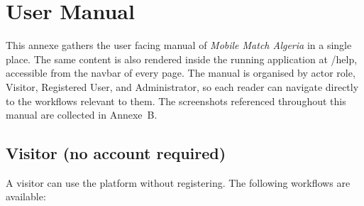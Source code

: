 
\appendix
\renewcommand{\chaptername}{Annexe}

\chapter{User Manual}
\label{annexe:manual}

This annexe gathers the user facing manual of \textit{Mobile Match Algeria} in a single place. The same content is also rendered inside the running application at /help, accessible from the navbar of every page. The manual is organised by actor role, Visitor, Registered User, and Administrator, so each reader can navigate directly to the workflows relevant to them. The screenshots referenced throughout this manual are collected in Annexe~B.

\section{Visitor (no account required)}

A visitor can use the platform without registering. The following workflows are available:


